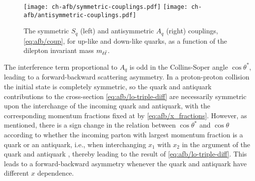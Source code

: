  
\begin{figure}
  \centering
  \texttt{[image: ch-afb/symmetric-couplings.pdf]}
  \texttt{[image: ch-afb/antisymmetric-couplings.pdf]}
  \caption{The symmetric $S_q$ (left) and antisymmetric $A_q$ (right)
    couplings, \cref{eq:afb/coup}, for up-like and
    down-like quarks, as a function of 
 the dilepton invariant mass $m_{\ell\bar{\ell}}$.
  }
  \label{fig:afb/lo-couplings}
\end{figure}

The interference term proportional to
$A_q$ is odd in the Collins-Soper angle $\cos\theta^*$, leading to a forward-backward
scattering asymmetry.
%
In a proton-proton collision the initial state is completely
symmetric, so the quark and antiquark contributions to the
cross-section \cref{eq:afb/lo-triple-diff} are necessarily symmetric
upon the interchange of the incoming quark and antiquark, with the
corresponding momentum fractions fixed at \lo by
\cref{eq:afb/x_fractions}.
%
However, as mentioned, there
is a sign change in the relation between $\cos\theta^*$ and
$\cos\theta$ according to whether the incoming parton with largest
momentum fraction is a quark or an antiquark, i.e.,
when interchanging
$x_1$ with $x_2$ in the argument of the quark and antiquark \pdfs,
thereby leading to the result of  \cref{eq:afb/lo-triple-diff}.
%
This leads
to a forward-backward asymmetry whenever the quark and antiquark
\pdfs have different $x$ dependence.

